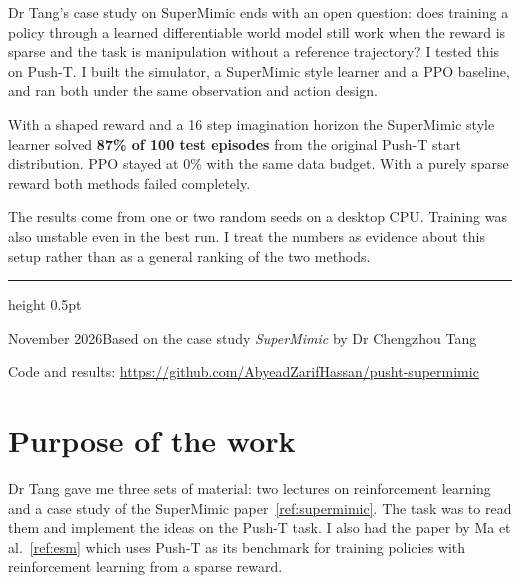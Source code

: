 \documentclass[11pt,a4paper]{article}
\renewcommand{\cite}[1]{\ref{ref:#1}}
\newcommand{\repo}{\url{https://github.com/AbyeadZarifHassan/pusht-supermimic}}
\begin{document}
\begin{titlepage}
\vspace{0.9cm}

\begin{tcolorbox}[reportbox,breakable=false,colback=PaleBlue,colframe=Blue!45,colbacktitle=PaleBlue,title={Report overview},fontupper=\small,before skip=0pt,after skip=0pt]
Dr Tang's case study on SuperMimic ends with an open question: does training a policy through a
learned differentiable world model still work when the reward is sparse and the task is
manipulation without a reference trajectory? I tested this on Push-T. I built the simulator, a
SuperMimic style learner and a PPO baseline, and ran both under the same observation and action
design.

\smallskip
With a shaped reward and a 16 step imagination horizon the SuperMimic style learner solved
\textbf{87\% of 100 test episodes} from the original Push-T start distribution. PPO stayed at 0\%
with the same data budget. With a purely sparse reward both methods failed completely.

\smallskip
The results come from one or two random seeds on a desktop CPU. Training was also unstable even in
the best run. I treat the numbers as evidence about this setup rather than as a general ranking of
the two methods.
\end{tcolorbox}

\vfill
\noindent\begin{minipage}{\textwidth}
  {\color{Rule}\hrule height 0.5pt}
  \vspace{0.2cm}
  {\small\color{Muted}November 2026\hfill Based on the case study \emph{SuperMimic} by Dr Chengzhou Tang\par
  \vspace{2pt}
  Code and results: \repo\par}
\end{minipage}
\endgroup
\end{titlepage}

\tableofcontents
\clearpage
{}

\section{Purpose of the work}
\label{sec:purpose}

Dr Tang gave me three sets of material: two lectures on reinforcement learning and a case study
of the SuperMimic paper~\cite{supermimic}. The task was to read them and implement the ideas on
the Push-T task. I also had the paper by Ma et al.~\cite{esm} which uses Push-T as its benchmark
for training policies with reinforcement learning from a sparse reward.
\end{document}
